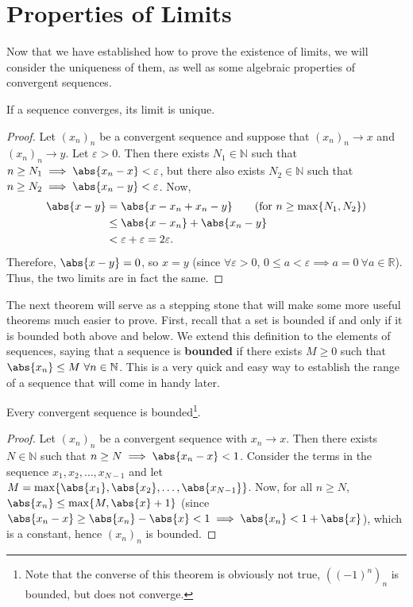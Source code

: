 \documentclass[../real_analysis.tex]{subfiles}
\begin{document}
    \section{Properties of Limits}\label{sec:properties-of-limits}
        Now that we have established how to prove the existence of limits, we will consider the uniqueness of them, as well as some algebraic properties of convergent sequences.
        \begin{theorem}
            If a sequence converges, its limit is unique.
        \end{theorem}
        \begin{proof}
            Let $(x_n)_n$ be a convergent sequence and suppose that $(x_n)_n\to x$ and $(x_n)_n\to y$. Let $\varepsilon>0$. Then there exists $N_1\in\mathbb{N}$ such that $n\geq N_1\implies\abs{x_n-x}<\varepsilon$, but there also exists $N_2\in\mathbb{N}$ such that $n\geq N_2\implies\abs{x_n-y}<\varepsilon$.
            Now,
            \begin{align}
                \abs{x-y} &= \abs{x-x_n+x_n-y}\tag{for $n\geq\max\{N_1, N_2\}$}\\
                &\leq\abs{x-x_n}+\abs{x_n-y}\\
                &<\varepsilon+\varepsilon=2\varepsilon.
            \end{align}
            Therefore, $\abs{x-y}=0$, so $x=y$ (since $\forall\varepsilon>0$, $0\leq a<\varepsilon\implies a=0\ \forall a\in\mathbb{R}$). Thus, the two limits are in fact the same.
        \end{proof}
        The next theorem will serve as a stepping stone that will make some more useful theorems much easier to prove. First, recall that a set is bounded if and only if it is bounded both above and below. We extend this definition to the elements of sequences, saying that a sequence is \textbf{bounded} if there exists $M\geq0$ such that $\abs{x_n}\leq M\ \forall n\in\mathbb{N}$. This is a very quick and easy way to establish the range of a sequence that will come in handy later.
        \begin{theorem}\label{thm:cvg-seq-bounded}
            Every convergent sequence is bounded\footnote{Note that the converse of this theorem is obviously not true, $((-1)^n)_n$ is bounded, but does not converge.}.
        \end{theorem}
        \begin{proof}
            Let $(x_n)_n$ be a convergent sequence with $x_n\to x$. Then there exists $N\in\mathbb{N}$ such that $n\geq N\implies\abs{x_n-x}<1$. Consider the terms in the sequence $x_1, x_2,\dots,x_{N-1}$ and let $M=\max\{\abs{x_1},\abs{x_2},\dots,\abs{x_{N-1}}\}$.
            Now, for all $n\geq N$, $\abs{x_n}\leq\max\{M, \abs{x}+1\}$ (since $\abs{x_n-x}\geq\abs{x_n}-\abs{x}<1\implies\abs{x_n}<1+\abs{x}$), which is a constant, hence $(x_n)_n$ is bounded.
        \end{proof}
\end{document}
